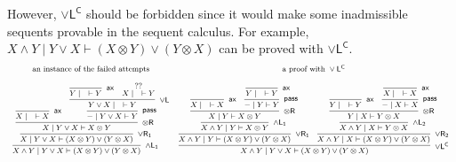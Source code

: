 \documentclass[submission,copyright,creativecommons]{eptcs}
\theoremstyle{definition}
\newcommand{\tr}{\otimes \mathsf{R}}
\newcommand{\pass}{\mathsf{pass}}
\newcommand{\andlone}{\land \mathsf{L_{1}}}
\newcommand{\andltwo}{\land \mathsf{L_{2}}}
\newcommand{\orl}{\lor \mathsf{L}}
\newcommand{\orrone}{\lor \mathsf{R_{1}}}
\newcommand{\orrtwo}{\lor \mathsf{R_{2}}}
\newcommand{\ax}{\mathsf{ax}}
\newcommand{\ot}{\otimes}
\begin{document}
However, $\orl^{\mathsf{C}}$ should be forbidden since it would make some inadmissible sequents provable in the sequent calculus. 
For example, $X \land Y \mid Y \lor X \vdash (X \ot Y) \lor (Y \ot X)$ can be proved with $\orl^{\mathsf{C}}$.
\begin{displaymath}
  \footnotesize
  \begin{array}{cc}
    \text{an instance of the failed attempts}
    &
    \text{a proof with } \orl^{\mathsf{C}}
    \\[10pt]
    \infer[\andlone]{X \land Y \mid Y \lor X \vdash (X \ot Y) \lor (Y \ot X)}{
    \infer[\orrone]{X \mid Y \lor X \vdash (X \ot Y) \lor (Y \ot X)}{
      \infer[\tr]{X \mid Y \lor X \vdash X \ot Y}{
        \infer[\ax]{X \mid \quad \vdash X}{}
        &
        \infer[\pass]{- \mid Y \lor X \vdash Y}{
          \infer[\orl]{Y \lor X \mid \quad \vdash Y}{
            \infer[\ax]{Y \mid \quad \vdash Y}{}
            &
            \deduce{X \mid \quad \vdash Y}{??}
          }
        }
      }
    }
  }
  &
  \infer[\orl^{\mathsf{C}}]{X \land Y \mid Y \lor X \vdash (X \ot Y) \lor (Y \ot X)}{
    \infer[\orrone]{X \land Y \mid Y \vdash (X \ot Y) \lor (Y \ot X)}{
      \infer[\andlone]{X \land Y \mid Y \vdash X \ot Y}{
        \infer[\tr]{X \mid Y \vdash X \ot Y}{
          \infer[\ax]{X \mid \quad \vdash X}{}
          &
          \infer[\pass]{- \mid Y \vdash Y}{
            \infer[\ax]{Y \mid \quad \vdash Y}{}
          }
        }
      }
    }
    &
    \infer[\orrtwo]{X \land Y \mid X \vdash (X \ot Y) \lor (Y \ot X)}{
      \infer[\andltwo]{X \land Y \mid X \vdash Y \ot X}{
        \infer[\tr]{Y \mid X \vdash Y \ot X}{
          \infer[\ax]{Y \mid \quad \vdash Y}{}
          &
          \infer[\pass]{- \mid X \vdash X}{
            \infer[\ax]{X \mid \quad \vdash X}{}
          }
        }
      }
    }
  }
  \end{array}
\end{displaymath}
\end{document}
